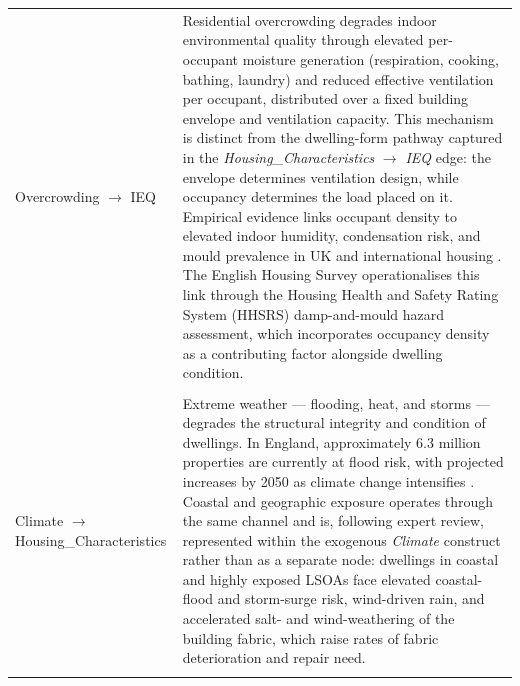 \begin{longtable}{@{}p{3.8cm}p{11.2cm}@{}}
Overcrowding $\to$ IEQ & Residential overcrowding degrades indoor environmental quality through elevated per-occupant moisture generation (respiration, cooking, bathing, laundry) and reduced effective ventilation per occupant, distributed over a fixed building envelope and ventilation capacity. This mechanism is distinct from the dwelling-form pathway captured in the \textit{Housing\_Characteristics} $\to$ \textit{IEQ} edge: the envelope determines ventilation design, while occupancy determines the load placed on it. Empirical evidence links occupant density to elevated indoor humidity, condensation risk, and mould prevalence in UK and international housing \citep{sharpe_fuel_2015, alfakih_indoor_2025, national_housing_federation_overcrowding_2023}. The English Housing Survey operationalises this link through the Housing Health and Safety Rating System (HHSRS) damp-and-mould hazard assessment, which incorporates occupancy density as a contributing factor alongside dwelling condition. \\
\addlinespace
\multicolumn{2}{@{}l}{\textit{Climate outgoing edges}}\\
\addlinespace
Climate $\to$ Housing\_Characteristics & Extreme weather --- flooding, heat, and storms --- degrades the structural integrity and condition of dwellings. In England, approximately 6.3 million properties are currently at flood risk, with projected increases by 2050 as climate change intensifies \citep{dawson_systems_2018, hayles_quantifying_2022}. Coastal and geographic exposure operates through the same channel and is, following expert review, represented within the exogenous \textit{Climate} construct rather than as a separate node: dwellings in coastal and highly exposed LSOAs face elevated coastal-flood and storm-surge risk, wind-driven rain, and accelerated salt- and wind-weathering of the building fabric, which raise rates of fabric deterioration and repair need. \\
\addlinespace

\end{longtable}
